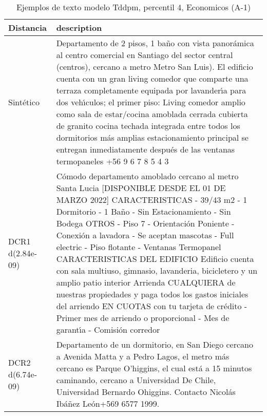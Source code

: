 \begin{table}[H]
\centering
\fontsize{10}{14}\selectfont
\caption{Ejemplos de texto modelo Tddpm, percentil 4, Economicos (A-1)}
\label{table-example-economicos-a-1-tddpm_mlp-4p-text}
\begin{tabular}{|l|m{35em}|}
\hline
\rowcolor[gray]{0.8}
Distancia & description \\
\hline Sintético & Departamento de 2 pisos, 1 ba\~no con vista panor\'amica al centro comercial en Santiago del sector central (centros), cercano a metro Metro San Luis). El edificio cuenta con un gran living comedor que comparte una terraza completamente equipada por lavander{\'\i}a para dos veh{\'\i}culos; el primer piso: Living comedor amplio como sala de estar/cocina amoblada cerrada cubierta de granito cocina techada integrada entre todos los dormitorios m\'as amplias estacionamiento principal se entregan inmediatamente despu\'es de las ventanas termopaneles +56 9 6 7 8 5 4 3 \\
\hline DCR1 d(2.84e-09) & C\'omodo departamento amoblado cercano al metro Santa Lucia  [DISPONIBLE DESDE EL 01 DE MARZO 2022]  CARACTERISTICAS - 39/43 m2 - 1 Dormitorio - 1 Ba\~no - Sin Estacionamiento - Sin Bodega  OTROS - Piso 7 - Orientaci\'on Poniente - Conexi\'on a lavadora - Se aceptan mascotas - Full electric  - Piso flotante - Ventanas Termopanel  CARACTERISTICAS DEL EDIFICIO Edificio cuenta con sala multiuso, gimnasio, lavanderia, bicicletero y un amplio patio interior  Arrienda CUALQUIERA de nuestras propiedades y paga todos los gastos iniciales del arriendo EN CUOTAS con tu tarjeta de cr\'edito - Primer mes de arriendo o proporcional - Mes de garant{\'\i}a - Comisi\'on corredor \\
\hline DCR2 d(6.74e-09) & Departamento de un dormitorio, en San Diego cercano a Avenida Matta y a Pedro Lagos, el metro m\'as cercano es Parque O'higgins, el cual est\'a a 15 minutos caminando, cercano a Universidad De Chile, Universidad Bernardo Ohiggins. Contacto Nicol\'as Ib\'a\~nez Le\'on+569 6577 1999. \\
\hline
\end{tabular}
\end{table}

